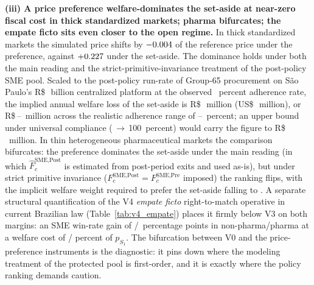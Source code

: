 \noindent\textbf{(iii) A \optPrefThreshold{} price preference welfare-dominates the set-aside at near-zero fiscal cost in thick standardized markets; pharma bifurcates; the empate ficto sits even closer to the open regime.} In thick standardized markets the simulated price shifts by $-0.004$ of the reference price under the preference, against $+0.227$ under the set-aside. The dominance holds under both the main reading and the strict-primitive-invariance treatment of the post-policy SME pool. Scaled to the post-policy run-rate of Group-65 procurement on São Paulo's R\$\,\becAnnualVolBRL~billion centralized platform at the observed \adherenceGsixtyfivePost~percent adherence rate, the implied annual welfare loss of the set-aside is R\$\,\welfAnnualBRLLo~million (US\$\,\welfAnnualUSDLo~million), or R\$\,\welfRangeLoBRL--\welfRangeHiBRL~million across the realistic adherence range of \welfAdherenceLoPct--\welfAdherenceHiPct~percent; an upper bound under universal compliance (\adherenceGsixtyfivePost{}\,$\to$\,100~percent) would carry the figure to R\$\,\welfAnnualBRLHi~million. In thin heterogeneous pharmaceutical markets the comparison bifurcates: the preference dominates the set-aside under the main reading (in which $\hat F_c^{\text{SME,Post}}$ is estimated from post-period exits and used as-is), but under strict primitive invariance ($F_c^{\text{SME,Post}} = F_c^{\text{SME,Pre}}$ imposed) the ranking flips, with the implicit welfare weight required to prefer the set-aside falling to \welfWeightSiPh. A separate structural quantification of the V4 \emph{empate ficto} right-to-match operative in current Brazilian law (Table~\ref{tab:v4_empate}) places it firmly below V3 on both margins: an SME win-rate gain of \vFourSmeWinGainNp/\vFourSmeWinGainPh{}~percentage points in non-pharma/pharma at a welfare cost of \vFourLossPctNp/\vFourLossPctPh{} percent of $p_{S_1}$. The bifurcation between V0 and the price-preference instruments is the diagnostic: it pins down where the modeling treatment of the protected pool is first-order, and it is exactly where the policy ranking demands caution.

